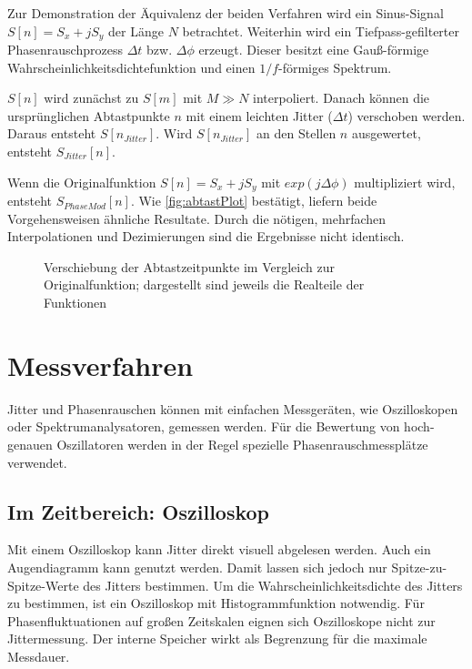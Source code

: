 Zur Demonstration der Äquivalenz der beiden Verfahren wird ein Sinus-Signal $S[n]=S_x+j S_y$ der Länge $N$ betrachtet. Weiterhin wird ein Tiefpass-gefilterter Phasenrauschprozess $\Delta t$ bzw. $\Delta \phi$ erzeugt. Dieser besitzt eine Gauß-förmige Wahrscheinlichkeitsdichtefunktion und einen $1/f$-förmiges Spektrum.

$S[n]$ wird zunächst zu $S[m]$ mit $M \gg N$ interpoliert. Danach können die ursprünglichen Abtastpunkte $n$ mit einem leichten Jitter ($\Delta t$) verschoben werden. Daraus entsteht $S[n_{Jitter}]$. Wird $S[n_{Jitter}]$ an den Stellen $n$ ausgewertet, entsteht $S_{Jitter}[n]$.

Wenn die Originalfunktion $S[n]=S_x+j S_y$ mit $exp(j \Delta \phi)$ multipliziert wird, entsteht $S_{PhaseMod}[n]$. Wie \autoref{fig:abtastPlot} bestätigt, liefern beide Vorgehensweisen ähnliche Resultate. Durch die nötigen, mehrfachen Interpolationen und Dezimierungen sind die Ergebnisse nicht identisch. 

\begin{figure}[H]
	\centering
	\caption[Verschiebung Abtastzeitpunkte]{Verschiebung der Abtastzeitpunkte im Vergleich zur Originalfunktion; dargestellt sind jeweils die Realteile der Funktionen}
	\label{fig:abtastPlot}
\end{figure}


\section{Messverfahren}
Jitter und Phasenrauschen können mit einfachen Messgeräten, wie Oszilloskopen oder Spektrumanalysatoren, gemessen werden. Für die Bewertung von hoch-genauen Oszillatoren werden in der Regel spezielle Phasenrauschmessplätze verwendet.

\subsection{Im Zeitbereich: Oszilloskop}
Mit einem Oszilloskop kann Jitter direkt visuell abgelesen werden. Auch ein Augendiagramm kann genutzt werden. Damit lassen sich jedoch nur Spitze-zu-Spitze-Werte des Jitters bestimmen. Um die Wahrscheinlichkeitsdichte des Jitters zu bestimmen, ist ein Oszilloskop mit Histogrammfunktion notwendig. Für Phasenfluktuationen auf großen Zeitskalen eignen sich Oszilloskope nicht zur Jittermessung. Der interne Speicher wirkt als Begrenzung für die maximale Messdauer.

